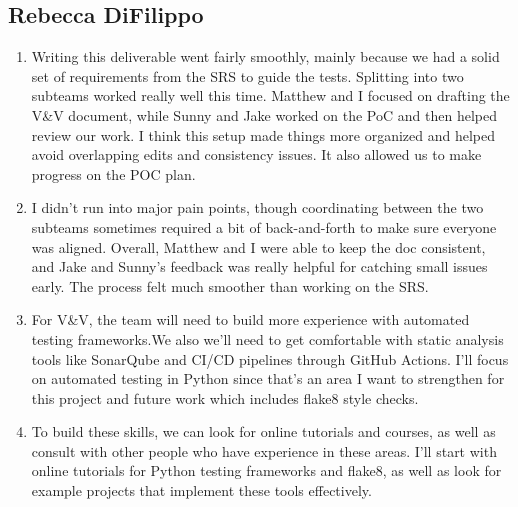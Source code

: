 \documentclass[12pt, titlepage]{article}
\begin{document}
\subsection*{Rebecca DiFilippo}
\begin{enumerate}
    \item Writing this deliverable went fairly smoothly, mainly because we had a solid set of
    requirements from the SRS to guide the tests. Splitting into two subteams worked really well
     this time. Matthew and I focused on drafting the V\&V document, while Sunny and Jake worked
     on the PoC and then helped review our work. I think this setup made things more organized and
      helped avoid overlapping edits and consistency issues. It also allowed us to make progress
      on the POC plan.

    \item I didn’t run into major pain points, though coordinating between the two subteams
     sometimes required a bit of back-and-forth to make sure everyone was aligned. Overall, Matthew
      and I were able to keep the doc consistent, and Jake and Sunny’s feedback was really helpful
       for catching small issues early. The process felt much smoother than working on the SRS.

    \item For V\&V, the team will need to build more experience with automated testing frameworks.We also we’ll need to
       get comfortable with static analysis tools like SonarQube and CI/CD pipelines through GitHub
        Actions. I’ll focus on automated testing in Python since that’s an area I want to strengthen
         for this project and future work which includes flake8 style checks.

    \item To build these skills, we can look for online  tutorials and courses, as well as consult
      with other people who have experience in these areas. I’ll start with online tutorials for
       Python testing frameworks and flake8, as well as look for example projects that implement
        these tools effectively.
\end{enumerate}
\end{document}

